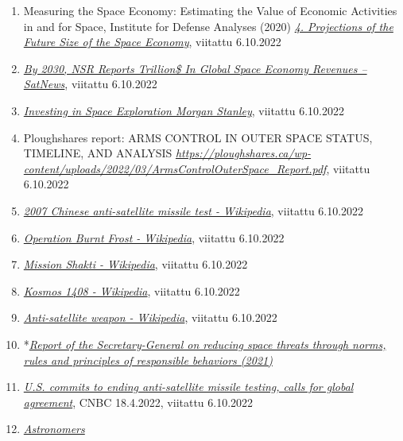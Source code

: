\documentclass[nobib,finnish,oneside,openany,notoc,a4paper]{tufte-book}
\begin{document}
{\begin{enumerate}
\item
  Measuring the Space Economy: Estimating the Value of Economic
  Activities in and for Space, Institute for Defense Analyses (2020)
  \href{https://www.jstor.org/stable/pdf/resrep25331.7.pdf}{\emph{4.
  Projections of the Future Size of the Space Economy}}, viitattu
  6.10.2022
\item
  \href{https://news.satnews.com/2022/01/27/by-2030-nsr-reports-trillion-in-global-space-economy-revenues/}{\emph{By
  2030, NSR Reports Trillion\$ In Global Space Economy Revenues --
  SatNews}}, viitattu 6.10.2022
\item
  \href{https://www.morganstanley.com/ideas/investing-in-space}{\emph{Investing
  in Space Exploration \textbar{} Morgan Stanley}}, viitattu 6.10.2022
\item
  Ploughshares report: ARMS CONTROL IN OUTER SPACE STATUS, TIMELINE, AND
  ANALYSIS\emph{
  }\href{https://ploughshares.ca/wp-content/uploads/2022/03/ArmsControlOuterSpace_Report.pdf}{\emph{https://ploughshares.ca/wp-content/uploads/2022/03/ArmsControlOuterSpace\_Report.pdf}},
  viitattu 6.10.2022
\item
  \href{https://en.wikipedia.org/wiki/2007_Chinese_anti-satellite_missile_test}{\emph{2007
  Chinese anti-satellite missile test - Wikipedia}}, viitattu 6.10.2022
\item
  \href{https://en.wikipedia.org/wiki/Operation_Burnt_Frost}{\emph{Operation
  Burnt Frost - Wikipedia}}, viitattu 6.10.2022
\item
  \href{https://en.wikipedia.org/wiki/Mission_Shakti}{\emph{Mission
  Shakti - Wikipedia}}, viitattu 6.10.2022
\item
  \href{https://en.wikipedia.org/wiki/Kosmos_1408}{\emph{Kosmos 1408 -
  Wikipedia}}, viitattu 6.10.2022
\item
  \href{https://en.wikipedia.org/wiki/Anti-satellite_weapon}{\emph{Anti-satellite
  weapon - Wikipedia}}, viitattu 6.10.2022
\item
    *\href{https://www.un.org/disarmament/topics/outerspace-sg-report-outer-space-2021/}{\emph{Report
    of the Secretary-General on reducing space threats through norms,
    rules and principles of responsible behaviors (2021)}}
\item
  \href{https://www.cnbc.com/2022/04/18/us-to-end-anti-satellite-asat-testing-calls-for-global-agreement.html}{\emph{U.S.
  commits to ending anti-satellite missile testing, calls for global
  agreement}}, CNBC 18.4.2022, viitattu 6.10.2022
\item
  \href{https://www.nature.com/articles/d41586-021-01954-4}{\emph{Astronomers
}}
\end{enumerate}}
\end{document}
